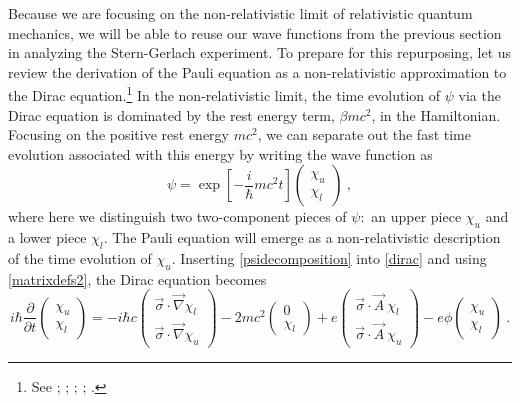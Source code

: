 \documentclass[onecolumn,secnumarabic,amsmath,amssymb,balancelastpage,nofootinbib]{article}
\begin{document}
Because we are focusing on the non-relativistic limit of relativistic quantum mechanics, we will be able to reuse our wave functions from the previous section in analyzing the Stern-Gerlach experiment.  To prepare for this repurposing, let us review the derivation of the Pauli equation as a non-relativistic approximation to the Dirac equation.\footnote{See \citet[sec.\ 1.4]{bjorkendrell}; \citet[sec.\ 33]{lifshitzRQM}; \citet[sec.\ 10.4]{bohmhiley}; \citet[sec.\ 2.6]{ryder}; \citet{nowakowski1999}.}  In the non-relativistic limit, the time evolution of $\psi$ via the Dirac equation is dominated by the rest energy term, $\beta m c^2$, in the Hamiltonian.  Focusing on the positive rest energy $m c^2$, we can separate out the fast time evolution associated with this energy by writing the wave function as
\begin{equation}
\psi= \exp\left[-\frac{i}{\hbar} m c^2 t \right] \left(\begin{matrix} \chi_u \\ \chi_l \end{matrix}\right)
\ ,
\label{psidecomposition}
\end{equation}
where here we distinguish two two-component pieces of $\psi$:\ an upper piece $\chi_u$ and a lower piece $\chi_l$.  The Pauli equation will emerge as a non-relativistic description of the time evolution of $\chi_u$.  Inserting \eqref{psidecomposition} into \eqref{dirac} and using \eqref{matrixdefs2}, the Dirac equation becomes
\begin{equation}
i \hbar \frac{\partial}{\partial t} \left(\begin{matrix} \chi_u \\ \chi_l \end{matrix}\right) =-i \hbar c \left(\begin{matrix} \vec{\sigma}\cdot\vec{\nabla} \chi_l \\ \vec{\sigma}\cdot\vec{\nabla}\chi_u \end{matrix}\right) - 2 m c^2 \left(\begin{matrix} 0 \\ \chi_l \end{matrix}\right) + e\left(\begin{matrix} \vec{\sigma}\cdot\vec{A}\: \chi_l \\ \vec{\sigma}\cdot\vec{A}\: \chi_u \end{matrix}\right)  - e \phi \left(\begin{matrix} \chi_u \\ \chi_l \end{matrix}\right)
\ .
\label{brokenupDirac}
\end{equation}
\end{document}
